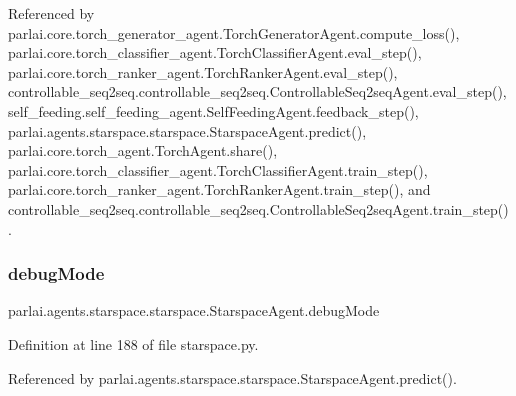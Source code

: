 Referenced by parlai.\+core.\+torch\+\_\+generator\+\_\+agent.\+Torch\+Generator\+Agent.\+compute\+\_\+loss(), parlai.\+core.\+torch\+\_\+classifier\+\_\+agent.\+Torch\+Classifier\+Agent.\+eval\+\_\+step(), parlai.\+core.\+torch\+\_\+ranker\+\_\+agent.\+Torch\+Ranker\+Agent.\+eval\+\_\+step(), controllable\+\_\+seq2seq.\+controllable\+\_\+seq2seq.\+Controllable\+Seq2seq\+Agent.\+eval\+\_\+step(), self\+\_\+feeding.\+self\+\_\+feeding\+\_\+agent.\+Self\+Feeding\+Agent.\+feedback\+\_\+step(), parlai.\+agents.\+starspace.\+starspace.\+Starspace\+Agent.\+predict(), parlai.\+core.\+torch\+\_\+agent.\+Torch\+Agent.\+share(), parlai.\+core.\+torch\+\_\+classifier\+\_\+agent.\+Torch\+Classifier\+Agent.\+train\+\_\+step(), parlai.\+core.\+torch\+\_\+ranker\+\_\+agent.\+Torch\+Ranker\+Agent.\+train\+\_\+step(), and controllable\+\_\+seq2seq.\+controllable\+\_\+seq2seq.\+Controllable\+Seq2seq\+Agent.\+train\+\_\+step().

\mbox{\label{classparlai_1_1agents_1_1starspace_1_1starspace_1_1StarspaceAgent_a668af7bc10cad919c8deff9b4f82e6d9}} 
\subsubsection{\texorpdfstring{debug\+Mode}{debugMode}}
{\footnotesize\ttfamily parlai.\+agents.\+starspace.\+starspace.\+Starspace\+Agent.\+debug\+Mode}



Definition at line 188 of file starspace.\+py.



Referenced by parlai.\+agents.\+starspace.\+starspace.\+Starspace\+Agent.\+predict().

\mbox{\label{classparlai_1_1agents_1_1starspace_1_1starspace_1_1StarspaceAgent_a650dfa9753ea9d80f8a81823d9fdc50a}} 
